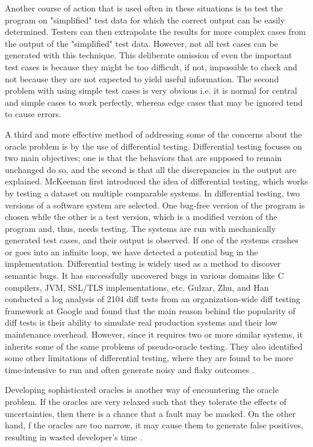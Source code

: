 Another course of action that is used often in these situations is to test the program on "simplified" test data for which the correct output can be easily determined. Testers can then extrapolate the results for more complex cases from the output of the "simplified" test data. However, not all test cases can be generated with this technique. This deliberate omission of even the important test cases is because they might be too difficult, if not, impossible to check and not because they are not expected to yield useful information. The second problem with using simple test cases is very obvious i.e. it is normal for central and simple cases to work perfectly, whereas edge cases that may be ignored tend to cause errors. \cite{Weyuker}

 
 A third and more effective method of addressing some of the concerns about the oracle problem is by the use of differential testing. Differential testing focuses on two main objectives; one is that the behaviors that are supposed to remain unchanged do so, and the second is that all the discrepancies in the output are explained. McKeeman \cite{McKeeman98differentialtesting} first introduced the idea of differential testing, which works by testing a dataset on multiple comparable systems. In differential testing, two versions of a software system are selected. One bug-free version of the program is chosen while the other is a test version, which is a modified version of the program and, thus, needs testing. The systems are run with mechanically generated test cases, and their output is observed. If one of the systems crashes or goes into an infinite loop, we have detected a potential bug in the implementation. Differential testing is widely used as a method to discover semantic bugs. It has successfully uncovered bugs in various domains like C compilers, JVM, SSL/TLS implementations, etc. Gulzar, Zhu, and Han \cite{gulzar2019} conducted a log analysis of 2104 diff tests from an organization-wide diff testing framework at Google and found that the main reason behind the popularity of diff tests is their ability to simulate real production systems and their low maintenance overhead. However, since it requires two or more similar systems, it inherits some of the same problems of pseudo-oracle testing. They also identified some other limitations of differential testing, where they are found to be more time-intensive to run and often generate noisy and flaky outcomes \cite{gulzar2019}.
 
 Developing sophisticated oracles is another way of encountering the oracle problem. If the oracles are very relaxed such that they tolerate the effects of uncertainties, then there is a chance that a fault may be masked. On the other hand, f the oracles are too narrow, it may cause them to generate false positives, resulting in wasted developer's time \cite{Elbaum2014}.